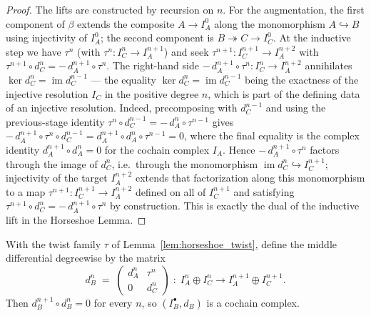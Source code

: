 \begin{proof}
  The lifts are constructed by recursion on \(n\). For the augmentation, the first
  component of \(\beta\) extends the composite \(A \to I_A^0\) along the monomorphism
  \(A \hookrightarrow B\) using injectivity of \(I_A^0\); the second component is
  \(B \twoheadrightarrow C \to I_C^0\).
  At the inductive step we have \(\tau^{n}\) (with \(\tau^{n} : I_C^{n} \to I_A^{n+1}\))
  and seek \(\tau^{n+1} : I_C^{n+1} \to I_A^{n+2}\) with
  \(\tau^{n+1} \circ d_C^n = -\,d_A^{n+1} \circ \tau^n\). The right-hand side
  \(-\,d_A^{n+1} \circ \tau^n : I_C^n \to I_A^{n+2}\) annihilates
  \(\ker d_C^n = \operatorname{im} d_C^{n-1}\) --- the equality \(\ker d_C^n =
  \operatorname{im} d_C^{n-1}\) being the exactness of the injective resolution \(I_C\) in
  the positive degree \(n\), which is part of the defining data of an injective resolution.
  Indeed, precomposing with \(d_C^{n-1}\) and using the
  previous-stage identity \(\tau^{n} \circ d_C^{n-1} = -\,d_A^{n} \circ \tau^{n-1}\) gives
  \(-\,d_A^{n+1} \circ \tau^n \circ d_C^{n-1} = d_A^{n+1} \circ d_A^{n} \circ \tau^{n-1} = 0\),
  where the final equality is the complex identity \(d_A^{n+1} \circ d_A^{n} = 0\) for the
  cochain complex \(I_A\). Hence
  \(-\,d_A^{n+1} \circ \tau^n\) factors through the image of \(d_C^n\), i.e.\ through the
  monomorphism \(\operatorname{im} d_C^n \hookrightarrow I_C^{n+1}\); injectivity of the
  target \(I_A^{n+2}\) extends that factorization along this monomorphism to a map
  \(\tau^{n+1} : I_C^{n+1} \to I_A^{n+2}\) defined on all of \(I_C^{n+1}\) and satisfying
  \(\tau^{n+1} \circ d_C^n = -\,d_A^{n+1} \circ \tau^n\) by construction. This is exactly
  the dual of the inductive lift in the Horseshoe Lemma.
\end{proof}

\begin{lemma}
  \label{lem:horseshoe_dComp}
  With the twist family \(\tau\) of Lemma~\ref{lem:horseshoe_twist}, define the middle
  differential degreewise by the matrix
  \[
    d_B^n \;=\;
    \begin{pmatrix} d_A^n & \tau^n \\ 0 & d_C^n \end{pmatrix}
    \;:\; I_A^n \oplus I_C^n \longrightarrow I_A^{n+1} \oplus I_C^{n+1}.
  \]
  Then \(d_B^{n+1} \circ d_B^n = 0\) for every \(n\), so \((I_B^\bullet, d_B)\) is a
  cochain complex.
\end{lemma}

